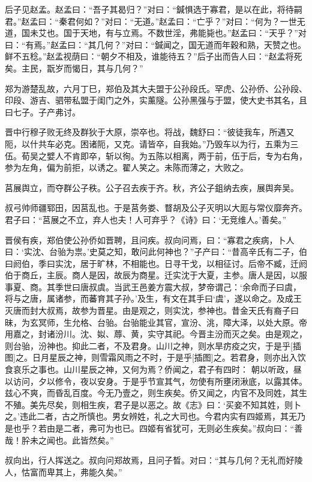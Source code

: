 \documentclass[a4paper,12pt,UTF8,twoside]{ctexbook}
\begin{document}
后子见赵孟。赵孟曰：“吾子其曷归？”对曰：“鍼惧选于寡君，是以在此，将待嗣君。”赵孟曰：“秦君何如？”对曰：“无道。”赵孟曰：“亡乎？”对曰：“何为？一世无道，国未艾也。国于天地，有与立焉。不数世淫，弗能毙也。”赵孟曰：“天乎？”对曰：“有焉。”赵孟曰：“其几何？”对曰：“鍼闻之，国无道而年穀和熟，天赞之也。鲜不五稔。”赵孟视荫曰：“朝夕不相及，谁能待五？”后子出而告人曰：“赵孟将死矣。主民，翫岁而愒日，其与几何？”

郑为游楚乱故，六月丁巳，郑伯及其大夫盟于公孙段氏。罕虎、公孙侨、公孙段、印段、游吉、驷带私盟于闺门之外，实薰隧。公孙黑强与于盟，使大史书其名，且曰七子。子产弗讨。

晋中行穆子败无终及群狄于大原，崇卒也。将战，魏舒曰：“彼徒我车，所遇又阨，以什共车必克。困诸阨，又克。请皆卒，自我始。”乃毁车以为行，五乘为三伍。荀吴之嬖人不肯即卒，斩以徇。为五陈以相离，两于前，伍于后，专为右角，参为左角，偏为前拒，以诱之。翟人笑之。未陈而薄之，大败之。

莒展舆立，而夺群公子秩。公子召去疾于齐。秋，齐公子鉏纳去疾，展舆奔吴。

叔弓帅师疆郓田，因莒乱也。于是莒务娄、瞀胡及公子灭明以大厖与常仪靡奔齐。君子曰：“莒展之不立，弃人也夫！人可弃乎？《诗》曰：‘无竞维人。’善矣。”

晋侯有疾，郑伯使公孙侨如晋聘，且问疾。叔向问焉，曰：“寡君之疾病，卜人曰：‘实沈、台骀为祟。’史莫之知，敢问此何神也？”子产曰：“昔高辛氏有二子，伯曰阏伯，季曰实沈，居于旷林，不相能也。日寻干戈，以相征讨。后帝不臧，迁阏伯于商丘，主辰。商人是因，故辰为商星。迁实沈于大夏，主参。唐人是因，以服事夏、商。其季世曰唐叔虞。当武王邑姜方震大叔，梦帝谓己：‘余命而子曰虞，将与之唐，属诸参，而蕃育其子孙。’及生，有文在其手曰‘虞’，遂以命之。及成王灭唐而封大叔焉，故参为晋星。由是观之，则实沈，参神也。昔金天氏有裔子曰昧，为玄冥师，生允格、台骀。台骀能业其官，宣汾、洮，障大泽，以处大原。帝用嘉之，封诸汾川。沈、姒、蓐、黄，实守其祀。今晋主汾而灭之矣。由是观之，则台骀，汾神也。抑此二者，不及君身。山川之神，则水旱疠疫之灾，于是乎[插图]之。日月星辰之神，则雪霜风雨之不时，于是乎[插图]之。若君身，则亦出入饮食哀乐之事也。山川星辰之神，又何为焉？侨闻之，君子有四时： 朝以听政，昼以访问，夕以修令，夜以安身。于是乎节宣其气，勿使有所壅闭湫底，以露其体。兹心不爽，而昏乱百度。今无乃壹之，则生疾矣。侨又闻之，内官不及同姓，其生不殖。美先尽矣，则相生疾，君子是以恶之。故《志》曰：‘买妾不知其姓，则卜之。’违此二者，古之所慎也。男女辨姓，礼之大司也。今君内实有四姬焉，其无乃是也乎？若由是二者，弗可为也已。四姬有省犹可，无则必生疾矣。”叔向曰：“善哉！肸未之闻也。此皆然矣。”

叔向出，行人挥送之。叔向问郑故焉，且问子晳。对曰：“其与几何？无礼而好陵人，怙富而卑其上，弗能久矣。”
\end{document}
